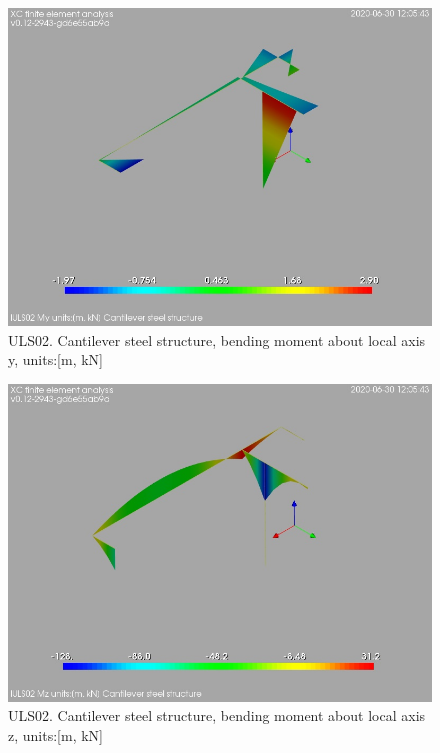 \begin{figure}
\begin{center}
\includegraphics[width=\linewidth]{ramp_wall/resLC/text/graphics/resSimplLC/lULS02steelMembersMy}
\caption{ULS02. Cantilever steel structure, bending moment about local axis y, units:[m, kN]}
\end{center}
\end{figure}
\begin{figure}
\begin{center}
\includegraphics[width=\linewidth]{ramp_wall/resLC/text/graphics/resSimplLC/lULS02steelMembersMz}
\caption{ULS02. Cantilever steel structure, bending moment about local axis z, units:[m, kN]}
\end{center}
\end{figure}
